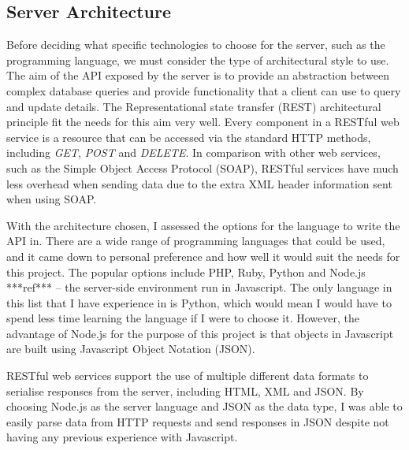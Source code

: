 




\subsection{Server Architecture} \label{subsection:server-architecture}

Before deciding what specific technologies to choose for the server, such as the programming language, we must consider the type of architectural style to use. The aim of the API exposed by the server is to provide an abstraction between complex database queries and provide functionality that a client can use to query and update details. The Representational state transfer (REST) architectural principle fit the needs for this aim very well. Every component in a RESTful web service is a resource that can be accessed via the standard HTTP methods, including \textit{GET}, \textit{POST} and \textit{DELETE}. In comparison with other web services, such as the Simple Object Access Protocol (SOAP), RESTful services have much less overhead when sending data due to the extra XML header information sent when using SOAP.

With the architecture chosen, I assessed the options for the language to write the API in. There are a wide range of programming languages that could be used, and it came down to personal preference and how well it would suit the needs for this project. The popular options include PHP, Ruby, Python and Node.js ***ref*** -- the server-side environment run in Javascript. The only language in this list that I have experience in is Python, which would mean I would have to spend less time learning the language if I were to choose it. However, the advantage of Node.js for the purpose of this project is that objects in Javascript are built using Javascript Object Notation (JSON).

 RESTful web services support the use of multiple different data formats to serialise responses from the server, including HTML, XML and JSON. By choosing Node.js as the server language and JSON as the data type, I was able to easily parse data from HTTP requests and send responses in JSON despite not having any previous experience with Javascript.

